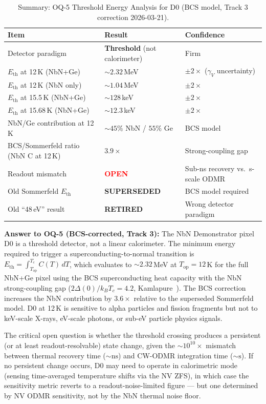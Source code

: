 \begin{table}[ht]
\centering
\caption{Summary: OQ-5 Threshold Energy Analysis for D0
(BCS model, Track 3 correction 2026-03-21).}
\label{tab:oq5_summary}
\small
\begin{tabular}{@{}lll@{}}
\toprule
Item & Result & Confidence \\
\midrule
Detector paradigm & \textbf{Threshold} (not calorimeter) & Firm \\
$E_\mathrm{th}$ at 12\,K (NbN+Ge) & $\sim 2.32$\,MeV &
  $\pm 2\times$ ($\gamma_V$ uncertainty) \\
$E_\mathrm{th}$ at 12\,K (NbN only) & $\sim 1.04$\,MeV &
  $\pm 2\times$ \\
$E_\mathrm{th}$ at 15.5\,K (NbN+Ge) & $\sim 128$\,keV &
  $\pm 2\times$ \\
$E_\mathrm{th}$ at 15.68\,K (NbN+Ge) & $\sim 12.3$\,keV &
  $\pm 2\times$ \\
NbN/Ge contribution at 12\,K & $\sim 45\%$ NbN / $55\%$ Ge & BCS model \\
BCS/Sommerfeld ratio (NbN C at 12\,K) & $3.9\times$ & Strong-coupling gap \\
Readout mismatch & \textcolor{red}{\textbf{OPEN}} &
  Sub-ns recovery vs.\ s-scale ODMR \\
Old Sommerfeld $E_\mathrm{th}$ & \textbf{SUPERSEDED} & BCS model required \\
Old ``48\,eV'' result & \textbf{RETIRED} & Wrong detector paradigm \\
\bottomrule
\end{tabular}
\end{table}

\noindent \textbf{Answer to OQ-5 (BCS-corrected, Track 3):} The NbN
Demonstrator pixel D0 is a threshold detector, not a linear calorimeter.
The minimum energy required to trigger a superconducting-to-normal
transition is $E_\mathrm{th} = \int_{T_\mathrm{op}}^{T_c} C(T)\,dT$,
which evaluates to $\sim 2.32$\,MeV at $T_\mathrm{op} = 12$\,K for the
full NbN+Ge pixel using the BCS superconducting heat capacity with the
NbN strong-coupling gap ($2\Delta(0)/k_BT_c = 4.2$,
Kamlapure~\cite{Kamlapure2010}).
The BCS correction increases the NbN contribution by $3.6\times$ relative
to the superseded Sommerfeld model. D0 at 12\,K is sensitive to alpha
particles and fission fragments but not to keV-scale X-rays, eV-scale
photons, or sub-eV particle physics signals.

The critical open question is whether the threshold crossing produces a
persistent (or at least readout-resolvable) state change, given the
$\sim 10^{10}\times$ mismatch between thermal recovery time
($\sim\!\mathrm{ns}$) and CW-ODMR integration time ($\sim\!\mathrm{s}$). If
no persistent change occurs, D0 may need to operate in calorimetric mode
(sensing time-averaged temperature shifts via the NV ZFS), in which case the
sensitivity metric reverts to a readout-noise-limited figure --- but one
determined by NV ODMR sensitivity, not by the NbN thermal noise floor.

